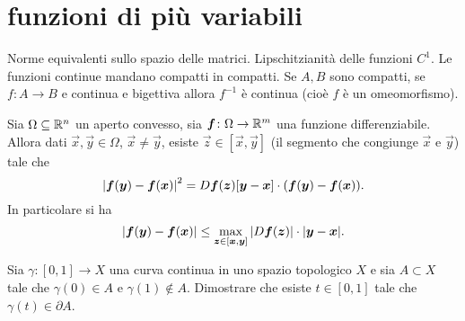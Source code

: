 \chapter{funzioni di più variabili}

Norme equivalenti sullo spazio delle matrici. Lipschitzianità delle funzioni $C^1$.
Le funzioni continue mandano compatti in compatti.
Se $A,B$ sono compatti, se $f\colon A\to B$ e continua e bigettiva allora 
$f^{-1}$ è continua (cioè $f$ è un omeomorfismo).


\begin{theorem}
  \label{th:lagrange}
Sia $\Omega\subseteq {\mathbb R}^n$ un aperto convesso, 
sia $\boldsymbol f\colon \Omega\to {\mathbb R}^m$ una funzione differenziabile.
Allora dati $\vec x,\vec y \in \Omega$, $\vec x\neq \vec y$, 
esiste $\vec z \in [\vec x,\vec y]$ (il segmento che congiunge $\vec x$ e $\vec y$)
tale che 
\[
 {\left|\boldsymbol f(\boldsymbol y)- \boldsymbol f(\boldsymbol x)\right|}^2
 =  D\boldsymbol f(\boldsymbol z)[\boldsymbol y-\boldsymbol x]\cdot (\boldsymbol f(\boldsymbol y)-\boldsymbol f(\boldsymbol x)).
\]
In particolare si ha 
\[
{\left|\boldsymbol f(\boldsymbol y)- \boldsymbol f(\boldsymbol x)\right|}
\le \max_{\boldsymbol z\in [\boldsymbol x,\boldsymbol y]} {\left|D\boldsymbol f(\boldsymbol z)\right|} \cdot {\left|\boldsymbol y-\boldsymbol x\right|}.
\]
\end{theorem}

\begin{exercise}
  \label{ex:punto-di-frontiera}
Sia $\gamma\colon [0,1] \to X$ una curva continua in uno 
spazio topologico $X$ e sia $A\subset X$ tale che 
$\gamma(0)\in A$ e $\gamma(1)\notin A$.
Dimostrare che esiste $t \in [0,1]$ tale che $\gamma(t) \in \partial A$.
\end{exercise}

